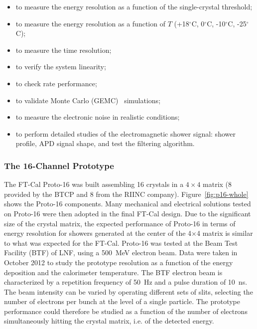 \begin{itemize}
\item to measure the energy resolution as a function of the single-crystal threshold;
\item to measure the energy resolution as a function of $T$ (+18$^\circ$C, 0$^\circ$C, -10$^\circ$C, -25$^\circ$C);
\item to measure the time resolution;
\item to verify the system linearity;
\item to check rate performance;
\item to validate Monte Carlo (GEMC)~\cite{sim-nim} simulations;
\item to measure the electronic noise in realistic conditions;
\item to perform detailed studies of the electromagnetic shower signal: shower profile, APD signal shape, and test
  the filtering algorithm.
\end{itemize}

\subsubsection{The 16-Channel Prototype}
\label{par:proto-16}

The FT-Cal Proto-16 was built assembling 16 crystals in a $4\times4$ matrix (8 provided by the BTCP and 8 from
the RIINC company). Figure~\ref{fig:p16-whole} shows the Proto-16 components. Many mechanical and electrical
solutions tested on Proto-16 were then adopted in the final FT-Cal design. Due to the significant size of the crystal
matrix, the expected performance of Proto-16 in terms of energy resolution for showers generated at the center
of the 4$\times$4 matrix is similar to what was expected for the FT-Cal. Proto-16 was tested at the Beam
Test Facility (BTF) \cite{btf} of LNF, using a 500~MeV electron beam. Data were taken in October 2012 to study
the prototype resolution as a function of the energy deposition and the calorimeter temperature. The BTF electron
beam is characterized by a repetition frequency of 50~Hz and a pulse duration of 10~ns. The beam intensity can be
varied by operating different sets of slits, selecting the number of electrons per bunch at the level of a single
particle. The prototype performance could therefore be studied as a function of the number of electrons 
simultaneously hitting the crystal matrix, i.e. of the detected energy.

